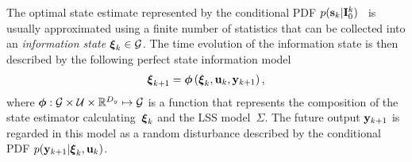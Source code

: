 \documentclass[conference,10pt]{IEEEtran}
\begin{document}
The optimal state estimate represented by the conditional PDF $p(\mathbf{s}_{k} \vert \mathbf{I}_{0}^{k})$~\cite{BarShalom2001:b} is usually approximated using a finite number of statistics that can be collected into an \emph{information state} $\boldsymbol{\xi}_{k}\in\mathcal{G}$. 
The time evolution of the information state is then described by the following perfect state information model
\begin{align} \label{ali:PerfectStateInformationModel}
	\boldsymbol{\xi}_{k+1} = \boldsymbol{\phi} \left(\boldsymbol{\xi}_{k},\mathbf{u}_{k},\mathbf{y}_{k+1} \right),
\end{align}
where $\boldsymbol{\phi}: \mathcal{G} \times \mathcal{U} \times \mathbb{R}^{D_y} \mapsto \mathcal{G}$ is a function that represents the composition of the state estimator calculating~$\boldsymbol{\xi}_k$ and the LSS model~$\Sigma$. 
The future output $\mathbf{y}_{k+1}$ is regarded in this model as a random disturbance described by the conditional PDF $p(\mathbf{y}_{k+1} \vert \boldsymbol{\xi}_{k},\mathbf{u}_{k})$.

\end{document}
